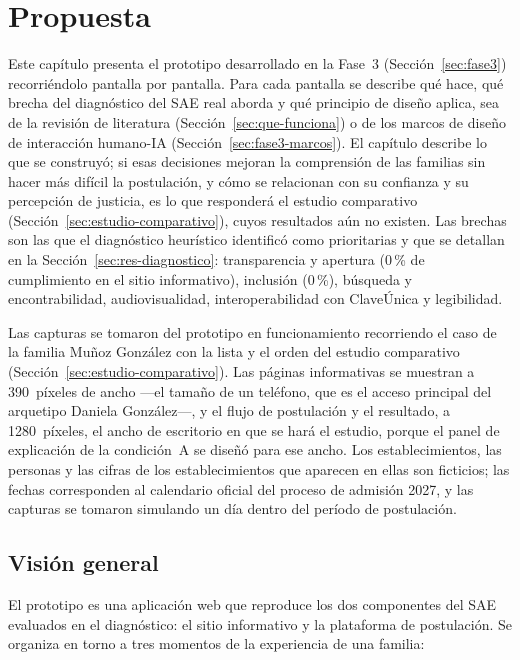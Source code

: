 \chapter{Propuesta}\label{cap:propuesta}

Este capítulo presenta el prototipo desarrollado en la Fase~3 (Sección~\ref{sec:fase3}) recorriéndolo pantalla por pantalla. Para cada pantalla se describe qué hace, qué brecha del diagnóstico del SAE real aborda y qué principio de diseño aplica, sea de la revisión de literatura (Sección~\ref{sec:que-funciona}) o de los marcos de diseño de interacción humano-IA (Sección~\ref{sec:fase3-marcos}). El capítulo describe lo que se construyó; si esas decisiones mejoran la comprensión de las familias sin hacer más difícil la postulación, y cómo se relacionan con su confianza y su percepción de justicia, es lo que responderá el estudio comparativo (Sección~\ref{sec:estudio-comparativo}), cuyos resultados aún no existen. Las brechas son las que el diagnóstico heurístico identificó como prioritarias y que se detallan en la Sección~\ref{sec:res-diagnostico}: transparencia y apertura (0\,\% de cumplimiento en el sitio informativo), inclusión (0\,\%), búsqueda y encontrabilidad, audiovisualidad, interoperabilidad con ClaveÚnica y legibilidad.

Las capturas se tomaron del prototipo en funcionamiento recorriendo el caso de la familia Muñoz González con la lista y el orden del estudio comparativo (Sección~\ref{sec:estudio-comparativo}). Las páginas informativas se muestran a 390~píxeles de ancho ---el tamaño de un teléfono, que es el acceso principal del arquetipo Daniela González---, y el flujo de postulación y el resultado, a 1280~píxeles, el ancho de escritorio en que se hará el estudio, porque el panel de explicación de la condición~A se diseñó para ese ancho. Los establecimientos, las personas y las cifras de los establecimientos que aparecen en ellas son ficticios; las fechas corresponden al calendario oficial del proceso de admisión 2027, y las capturas se tomaron simulando un día dentro del período de postulación.

\section{Visión general}\label{sec:prop-general}

El prototipo es una aplicación web que reproduce los dos componentes del SAE evaluados en el diagnóstico: el sitio informativo y la plataforma de postulación. Se organiza en torno a tres momentos de la experiencia de una familia:

